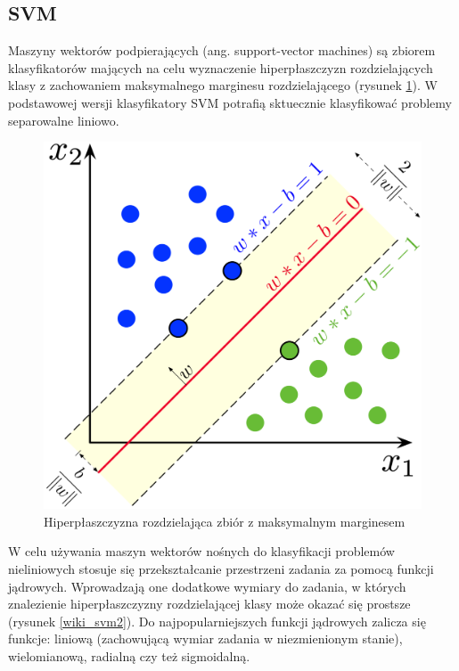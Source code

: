 \documentclass[a4paper, twoside, 11pt, openright]{article}
\begin{document}

\subsection{SVM \cite{svm}}

Maszyny wektorów podpierających (ang. support-vector machines) są zbiorem klasyfikatorów mających na celu wyznaczenie hiperpłaszczyzn rozdzielających klasy z zachowaniem maksymalnego marginesu rozdzielającego (rysunek \ref{wiki_svm}). W podstawowej wersji klasyfikatory SVM potrafią sktuecznie klasyfikować problemy separowalne liniowo.


\begin{figure}[H]
\centering \includegraphics[scale=0.9]{img/svm.png}
\caption{Hiperpłaszczyzna rozdzielająca zbiór z maksymalnym marginesem \cite{wikisvm}}
\label{wiki_svm}
\end{figure}

W celu używania maszyn wektorów nośnych do klasyfikacji problemów nieliniowych stosuje się przekształcanie przestrzeni zadania za pomocą funkcji jądrowych. Wprowadzają one dodatkowe wymiary do zadania, w których znalezienie hiperpłaszczyzny rozdzielającej klasy może okazać się prostsze (rysunek \ref{wiki_svm2}). Do najpopularniejszych funkcji jądrowych zalicza się funkcje: liniową (zachowującą wymiar zadania w niezmienionym stanie), wielomianową, radialną czy też sigmoidalną.
\end{document}
